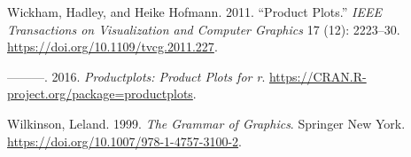 \begin{CSLReferences}{1}{0}
\leavevmode{}%
Wickham, Hadley, and Heike Hofmann. 2011. {``Product Plots.''} \emph{IEEE Transactions on Visualization and Computer Graphics} 17 (12): 2223--30. \url{https://doi.org/10.1109/tvcg.2011.227}.

\leavevmode{}%
---------. 2016. \emph{Productplots: Product Plots for r}. \url{https://CRAN.R-project.org/package=productplots}.

\leavevmode{}%
Wilkinson, Leland. 1999. \emph{The Grammar of Graphics}. Springer New York. \url{https://doi.org/10.1007/978-1-4757-3100-2}.

\end{CSLReferences}



\address{%
Haley Jeppson\\
Department of Statistics\\%
Iowa State University\\ 2438 Osborn Dr\\ Ames, IA 50011\\
%
%
\textit{ORCiD: \href{https://orcid.org/0000-0003-2524-4063}{0000-0003-2524-4063}}\\%
\href{mailto:hjeppson@iastate.edu}{\nolinkurl{hjeppson@iastate.edu}}%
}

\address{%
Heike Hofmann\\
Department of Statistics\\%
Center for Statistics and Applications in Forensic Evidence\\ Iowa State University\\ 2438 Osborn Dr\\ Ames, IA 50011\\
%
%
\textit{ORCiD: \href{https://orcid.org/0000-0001-6216-5183}{0000-0001-6216-5183}}\\%
\href{mailto:hofmann@iastate.edu}{\nolinkurl{hofmann@iastate.edu}}%
}
